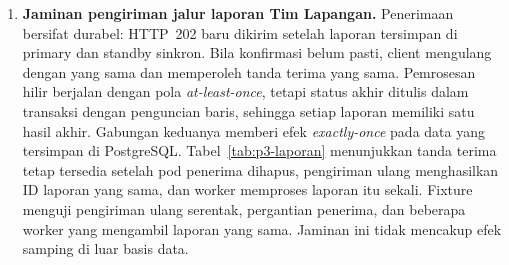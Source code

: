 \begin{enumerate}
\item \textbf{Jaminan pengiriman jalur laporan Tim Lapangan.} Penerimaan bersifat durabel: HTTP~202 baru dikirim setelah laporan tersimpan di primary dan standby sinkron. Bila konfirmasi belum pasti, client mengulang dengan  yang sama dan memperoleh tanda terima yang sama. Pemrosesan hilir berjalan dengan pola \emph{at-least-once}, tetapi status akhir ditulis dalam transaksi dengan penguncian baris, sehingga setiap laporan memiliki satu hasil akhir. Gabungan keduanya memberi efek \emph{exactly-once} pada data yang tersimpan di PostgreSQL. Tabel~\ref{tab:p3-laporan} menunjukkan tanda terima tetap tersedia setelah pod penerima dihapus, pengiriman ulang menghasilkan ID laporan yang sama, dan worker memproses laporan itu sekali. Fixture  menguji pengiriman ulang serentak, pergantian penerima, dan beberapa worker yang mengambil laporan yang sama. Jaminan ini tidak mencakup efek samping di luar basis data.
\end{enumerate}
